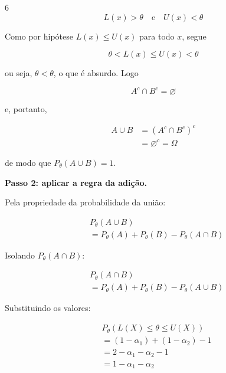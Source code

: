 \documentclass[8pt, a4paper, landscape]{extarticle}
\begin{document}
\begin{multicols}{6}
\begin{equation*}
L(x) > \theta \quad \text{e} \quad U(x) < \theta
\end{equation*}

Como por hipótese $L(x) \leq U(x)$ para todo $x$, segue

\begin{equation*}
\theta < L(x) \leq U(x) < \theta
\end{equation*}

ou seja, $\theta < \theta$, o que é absurdo. Logo

\begin{equation*}
A^c \cap B^c = \varnothing
\end{equation*}

e, portanto,

\begin{equation*}
\begin{split}
A \cup B &= (A^c \cap B^c)^c \\
&= \varnothing^c = \Omega
\end{split}
\end{equation*}

de modo que $P_\theta(A \cup B) = 1$.

\vspace{0.2cm}

\textbf{Passo 2: aplicar a regra da adição.}

Pela propriedade da probabilidade da união:

\begin{equation*}
\begin{split}
&P_\theta(A \cup B) \\
&= P_\theta(A) + P_\theta(B) - P_\theta(A \cap B)
\end{split}
\end{equation*}

Isolando $P_\theta(A \cap B)$:

\begin{equation*}
\begin{split}
&P_\theta(A \cap B) \\
&= P_\theta(A) + P_\theta(B) - P_\theta(A \cup B)
\end{split}
\end{equation*}

Substituindo os valores:

\begin{equation*}
\begin{split}
&P_\theta(L(X) \leq \theta \leq U(X)) \\
&= (1 - \alpha_1) + (1 - \alpha_2) - 1 \\
&= 2 - \alpha_1 - \alpha_2 - 1 \\
&= 1 - \alpha_1 - \alpha_2
\end{split}
\end{equation*}


\end{multicols}
\end{document}
